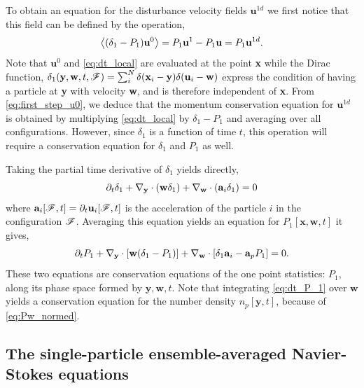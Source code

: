 To obtain an equation for the disturbance velocity fields $\textbf{u}^{1d}$ we first notice that this field can be defined by the operation, 
\begin{equation}
    \avg{(\delta_1 - P_1) \textbf{u}^0}
    =
    P_1 \textbf{u}^1
    - P_1 \textbf{u}
    = P_1 \textbf{u}^{1d}. 
    \label{eq:first_step_u0}
\end{equation}
Note that $\textbf{u}^0$ and \ref{eq:dt_local} are evaluated at the point \textbf{x} while the Dirac function, $\delta_1(\textbf{y},\textbf{w},t,\mathscr{F}) = \sum_i^N \delta(\textbf{x}_i-\textbf{y})\delta(\textbf{u}_i - \textbf{w})$ express the condition of having a particle at \textbf{y} with velocity \textbf{w}, and is therefore independent of \textbf{x}. 
From \ref{eq:first_step_u0}, we deduce that the momentum conservation equation for $\textbf{u}^{1d}$ is obtained by multiplying \ref{eq:dt_local} by $\delta_1 - P_1$ and averaging over all configurations. 
However, since $\delta_1$ is a function of time $t$, this operation will require a conservation equation for $\delta_1$ and $P_1$ as well.  

Taking the partial time derivative of $\delta_1$ yields directly, 
\begin{equation}
    \pddt\delta_1 
    + \pddy\cdot(\textbf{w}\delta_1)
    + \pddw\cdot(\textbf{a}_i\delta_1)
    = 0 
    \label{eq:dt_delta_1}
\end{equation}
where $\textbf{a}_i[\mathscr{F},t] = \partial_t \textbf{u}_i[\mathscr{F},t]$ is the acceleration of the particle $i$ in the configuration $\mathscr{F}$. 
Averaging this equation yields an equation for  $P_1[\textbf{x},\textbf{w},t]$ it gives, 
\begin{equation}
    \pddt P_1
    + \pddy\cdot[\textbf{w} (\delta_1 - P_1)]
    + \pddw\cdot[\delta_1 \textbf{a}_i - \textbf{a}_p P_1]
    = 0.
    \label{eq:dt_P_1}
\end{equation}
These two equations are conservation equations of the one point statistics: $P_1$,  along its phase space formed by $\textbf{y},\textbf{w},t$. 
Note that integrating \ref{eq:dt_P_1} over $\textbf{w}$ yields a conservation equation for the number density $n_p[\textbf{y},t]$, because of \ref{eq:Pw_normed}.  

\subsection{The single-particle ensemble-averaged Navier-Stokes equations}

